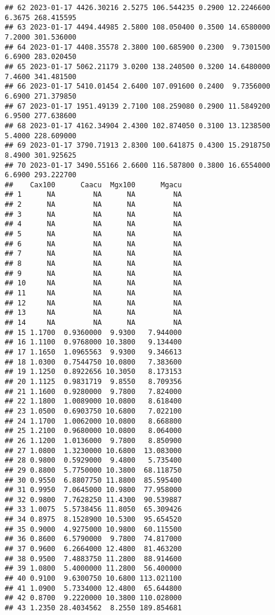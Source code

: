 \documentclass[
]{article}
\begin{document}
\begin{verbatim}
## 62 2023-01-17 4426.30216 2.5275 106.544235 0.2900 12.2246600  6.3675 268.415595
## 63 2023-01-17 4494.44985 2.5800 108.050400 0.3500 14.6580000  7.2000 301.536000
## 64 2023-01-17 4408.35578 2.3800 100.685900 0.2300  9.7301500  6.6900 283.020450
## 65 2023-01-17 5062.21179 3.0200 138.240500 0.3200 14.6480000  7.4600 341.481500
## 66 2023-01-17 5410.01454 2.6400 107.091600 0.2400  9.7356000  6.6900 271.379850
## 67 2023-01-17 1951.49139 2.7100 108.259080 0.2900 11.5849200  6.9500 277.638600
## 68 2023-01-17 4162.34904 2.4300 102.874050 0.3100 13.1238500  5.4000 228.609000
## 69 2023-01-17 3790.71913 2.8300 100.641875 0.4300 15.2918750  8.4900 301.925625
## 70 2023-01-17 3490.55166 2.6600 116.587800 0.3800 16.6554000  6.6900 293.222700
##    Cax100      Caacu  Mgx100      Mgacu
## 1      NA         NA      NA         NA
## 2      NA         NA      NA         NA
## 3      NA         NA      NA         NA
## 4      NA         NA      NA         NA
## 5      NA         NA      NA         NA
## 6      NA         NA      NA         NA
## 7      NA         NA      NA         NA
## 8      NA         NA      NA         NA
## 9      NA         NA      NA         NA
## 10     NA         NA      NA         NA
## 11     NA         NA      NA         NA
## 12     NA         NA      NA         NA
## 13     NA         NA      NA         NA
## 14     NA         NA      NA         NA
## 15 1.1700  0.9360000  9.9300   7.944000
## 16 1.1100  0.9768000 10.3800   9.134400
## 17 1.1650  1.0965563  9.9300   9.346613
## 18 1.0300  0.7544750 10.0800   7.383600
## 19 1.1250  0.8922656 10.3050   8.173153
## 20 1.1125  0.9831719  9.8550   8.709356
## 21 1.1600  0.9280000  9.7800   7.824000
## 22 1.1800  1.0089000 10.0800   8.618400
## 23 1.0500  0.6903750 10.6800   7.022100
## 24 1.1700  1.0062000 10.0800   8.668800
## 25 1.2100  0.9680000 10.0800   8.064000
## 26 1.1200  1.0136000  9.7800   8.850900
## 27 1.0800  1.3230000 10.6800  13.083000
## 28 0.9800  0.5929000  9.4800   5.735400
## 29 0.8800  5.7750000 10.3800  68.118750
## 30 0.9550  6.8807750 11.8800  85.595400
## 31 0.9950  7.0645000 10.9800  77.958000
## 32 0.9800  7.7628250 11.4300  90.539887
## 33 1.0075  5.5738456 11.8050  65.309426
## 34 0.8975  8.1528900 10.5300  95.654520
## 35 0.9000  4.9275000 10.9800  60.115500
## 36 0.8600  6.5790000  9.7800  74.817000
## 37 0.9600  6.2664000 12.4800  81.463200
## 38 0.9500  7.4883750 11.2800  88.914600
## 39 1.0800  5.4000000 11.2800  56.400000
## 40 0.9100  9.6300750 10.6800 113.021100
## 41 1.0900  5.7334000 12.4800  65.644800
## 42 0.8700  9.2220000 10.3800 110.028000
## 43 1.2350 28.4034562  8.2550 189.854681

\end{verbatim}
\end{document}
